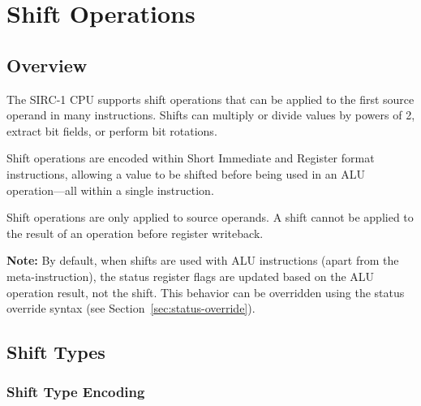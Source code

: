 \chapter{Shift Operations}
\label{ch:shift-operations}

\section{Overview}

The SIRC-1 CPU supports shift operations that can be applied to the first source operand in many instructions. Shifts
can multiply or divide values by powers of 2, extract bit fields, or perform bit rotations.

Shift operations are encoded within Short Immediate and Register format instructions, allowing a value to be shifted
before being used in an ALU operation—all within a single instruction.

Shift operations are only applied to source operands. A shift cannot be applied to the result of an operation before
register writeback.

\textbf{Note:} By default, when shifts are used with ALU instructions (apart from the  meta-instruction), the status register flags are updated based on the ALU operation result, not the shift. This behavior can be overridden using the status override syntax (see Section~\ref{sec:status-override}).

\section{Shift Types}

\subsection{Shift Type Encoding}

